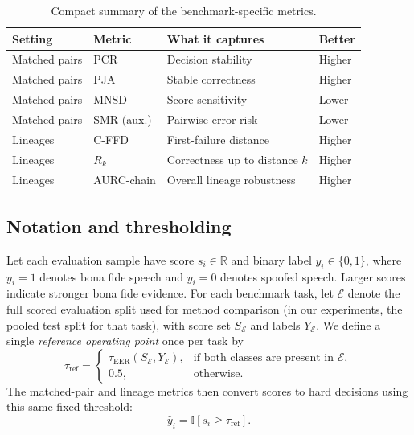 \begin{table}[t]
\caption{Compact summary of the benchmark-specific metrics.}
\label{tab:appendix_new_metrics_summary}
\centering
\small
\setlength{\tabcolsep}{5pt}
\renewcommand{\arraystretch}{1.10}
\begin{tabular}{@{}p{}p{}p{}p{}@{}}
\toprule
\textbf{Setting} & \textbf{Metric} & \textbf{What it captures} & \textbf{Better} \\
\midrule
Matched pairs & PCR & Decision stability & Higher \\
Matched pairs & PJA & Stable correctness & Higher \\
Matched pairs & MNSD & Score sensitivity & Lower \\
Matched pairs & SMR (aux.) & Pairwise error risk & Lower \\
Lineages & C-FFD & First-failure distance & Higher \\
Lineages & $R_k$ & Correctness up to distance $k$ & Higher \\
Lineages & AURC-chain & Overall lineage robustness & Higher \\
\bottomrule
\end{tabular}
\end{table}

\subsection{Notation and thresholding}

Let each evaluation sample have score $s_i \in \mathbb{R}$ and binary label $y_i \in \{0,1\}$, where $y_i=1$ denotes bona fide speech and $y_i=0$ denotes spoofed speech. Larger scores indicate stronger bona fide evidence. For each benchmark task, let $\mathcal{E}$ denote the full scored evaluation split used for method comparison (in our experiments, the pooled test split for that task), with score set $S_{\mathcal{E}}$ and labels $Y_{\mathcal{E}}$. We define a single \emph{reference operating point} once per task by
\begin{equation}
\tau_{\mathrm{ref}} =
\begin{cases}
\tau_{\mathrm{EER}}(S_{\mathcal{E}}, Y_{\mathcal{E}}), & \text{if both classes are present in } \mathcal{E},\\
0.5, & \text{otherwise}.
\end{cases}
\label{eq:pair_threshold}
\end{equation}
The matched-pair and lineage metrics then convert scores to hard decisions using this same fixed threshold:
\begin{equation}
\hat{y}_i = \mathbb{I}[s_i \ge \tau_{\mathrm{ref}}].
\label{eq:pair_decision}
\end{equation}

